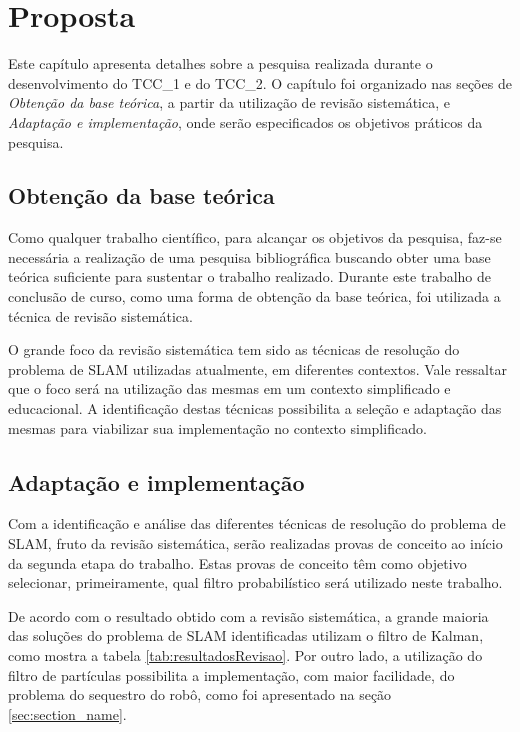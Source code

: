 \chapter[Proposta]{Proposta}

Este capítulo apresenta detalhes sobre a pesquisa realizada durante o desenvolvimento do TCC\_1 e do TCC\_2. O capítulo foi organizado nas seções de \textit{Obtenção da base teórica}, a partir da utilização de revisão sistemática, e \textit{Adaptação e implementação}, onde serão especificados os objetivos práticos da pesquisa.

\section{Obtenção da base teórica} %
\label{sec:obtenção_da_base_teórica}
	
	Como qualquer trabalho científico, para alcançar os objetivos da pesquisa, faz-se necessária a realização de uma pesquisa bibliográfica buscando obter uma base teórica suficiente para sustentar o trabalho realizado. Durante este trabalho de conclusão de curso, como uma forma de obtenção da base teórica, foi utilizada a técnica de revisão sistemática.

	O grande foco da revisão sistemática tem sido as técnicas de resolução do problema de SLAM utilizadas atualmente, em diferentes contextos. Vale ressaltar que o foco será na utilização das mesmas em um contexto simplificado e educacional. A identificação destas técnicas possibilita a seleção e adaptação das mesmas para viabilizar sua implementação no contexto simplificado.

\section{Adaptação e implementação} %
\label{sec:adaptação_e_implementação}

	Com a identificação e análise das diferentes técnicas de resolução do problema de SLAM, fruto da revisão sistemática, serão realizadas provas de conceito ao início da segunda etapa do trabalho. Estas provas de conceito têm como objetivo selecionar, primeiramente, qual filtro probabilístico será utilizado neste trabalho.

	De acordo com o resultado obtido com a revisão sistemática, a grande maioria das soluções do problema de SLAM identificadas utilizam o filtro de Kalman, como mostra a tabela \ref{tab:resultadosRevisao}. Por outro lado, a utilização do filtro de partículas possibilita a implementação, com maior facilidade, do problema do sequestro do robô, como foi apresentado na seção \ref{sec:section_name}.

